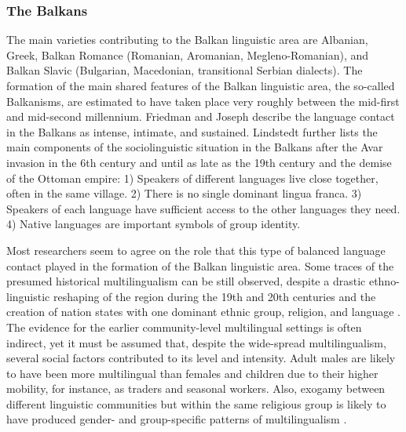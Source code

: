 \documentclass[output=paper,
modfonts
]{langscibook}
\begin{document}
\subsubsection*{The Balkans}
% 
% 

\noindent The main varieties contributing to the Balkan linguistic area are Albanian, Greek, Balkan Romance (Romanian, Aromanian, Megleno-Romanian), and Balkan Slavic (Bulgarian, Macedonian, transitional Serbian dialects). The formation of the main shared features of the Balkan linguistic area, the so-called Balkanisms, are estimated to have taken place very roughly between the mid-first and mid-second millennium. Friedman and Joseph \parencite*{friedmanjoseph14} describe the language contact in the Balkans as intense, intimate, and sustained. Lindstedt \parencite*[239]{lindstedt00} further lists the main components of the sociolinguistic situation in the Balkans after the Avar invasion in the 6th century and until as late as the 19th century and the demise of the Ottoman empire: 1) Speakers of different languages live close together, often in the same village. 2) There is no single dominant lingua franca. 3) Speakers of each language have sufficient access to the other languages they need. 4) Native languages are important symbols of group identity.
% 
% 

Most researchers seem to agree on the role that this type of balanced language contact played in the formation of the Balkan linguistic area. Some traces of the presumed historical multilingualism can be still observed, despite a drastic ethno-linguistic reshaping of the region during the 19th and 20th centuries and the creation of nation states with one dominant ethnic group, religion, and language \parencite[4--10]{makartsevandwahlstrom16}. The evidence for the earlier community-level multilingual settings is often indirect, yet it must be assumed that, despite the wide-spread multilingualism, several social factors contributed to its level and intensity. Adult males are likely to have been more multilingual than females and children due to their higher mobility, for instance, as traders and seasonal workers. Also, exogamy between different linguistic communities but within the same religious group is likely to have produced gender- and group-specific patterns of multilingualism \parencite[see, e.g., ][]{morozova17}.
\end{document}

